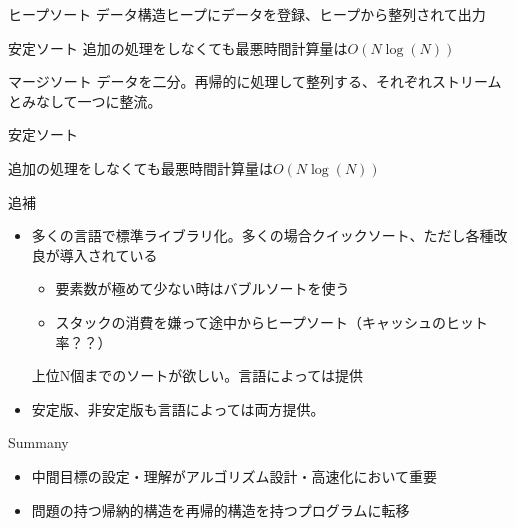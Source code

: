 \documentclass{beamer}
\begin{document}
\begin{frame}[fragile]{ヒープソート}{}
データ構造ヒープにデータを登録、ヒープから整列されて出力

安定ソート
\vfill
追加の処理をしなくても最悪時間計算量は$O(N\log(N))$
\end{frame}

\begin{frame}[fragile]{マージソート}{}
データを二分。再帰的に処理して整列する、それぞれストリームとみなして一つに整流。

安定ソート

\vfill
追加の処理をしなくても最悪時間計算量は$O(N\log(N))$
\end{frame}

\begin{frame}[fragile]{追補}{}
\begin{itemize}\itemsep8pt
\item 多くの言語で標準ライブラリ化。多くの場合クイックソート、ただし各種改良が導入されている
\begin{itemize}%
\item 要素数が極めて少ない時はバブルソートを使う
\item スタックの消費を嫌って途中からヒープソート（キャッシュのヒット率？？）
\end{itemize}
\vfill 上位N個までのソートが欲しい。言語によっては提供
\item 安定版、非安定版も言語によっては両方提供。
\end{itemize}
\end{frame}

\begin{frame}[fragile]{Summany}{}
\begin{itemize}%
\item 中間目標の設定・理解がアルゴリズム設計・高速化において重要
\item 問題の持つ帰納的構造を再帰的構造を持つプログラムに転移
\end{itemize}
\end{frame}
\end{document}
